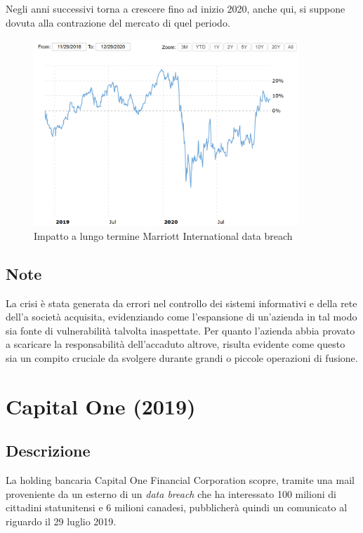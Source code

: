 \documentclass[12pt,a4paper,openright,twoside]{report}
\begin{document}
Negli anni successivi torna a crescere fino ad inizio 2020, anche qui, si suppone dovuta alla contrazione del mercato di quel periodo.\\

\begin{figure}[H] 
\begin{center} 
\includegraphics[width=10cm]{figures/marriott_long.png} 
\caption[Grafico Marriott long]{Impatto a lungo termine  Marriott International data breach}\label{fig:mrt2}
\end{center}
\end{figure}

\subsection{Note}
La crisi \`e stata generata da errori nel controllo dei sistemi informativi e della rete dell'a societ\`a acquisita, evidenziando come l'espansione di un'azienda in tal modo sia fonte di vulnerabilit\`a talvolta inaspettate. Per quanto l'azienda abbia provato a scaricare la responsabilit\`a dell'accaduto altrove, risulta evidente come questo sia un compito cruciale da svolgere durante grandi o piccole operazioni di fusione.\\ 
\section{Capital One (2019)}
\subsection{Descrizione}
La holding bancaria Capital One Financial Corporation scopre, tramite una mail proveniente da un esterno di un \textit{data breach} che ha interessato 100 milioni di cittadini statunitensi e 6 milioni canadesi, pubblicher\`a quindi un comunicato al riguardo il 29 luglio 2019\cite{CapitalOne_case_study}.
\end{document}
